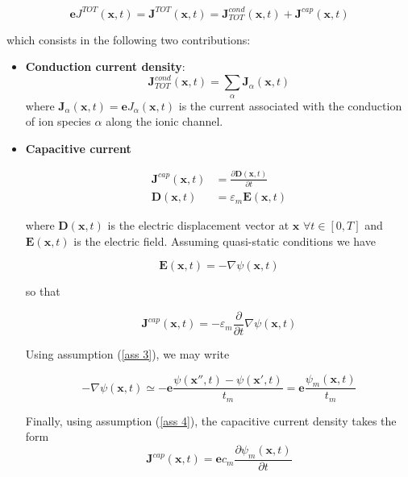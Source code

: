\documentclass[12pt, a4paper]{report}
\begin{document}
\begin{equation}
\textbf{e} J^{TOT}(\textbf{x},t) =	\textbf{J}^{TOT}(\textbf{x},t) = \textbf{J}^{cond}_{TOT}(\textbf{x},t) +\textbf{J}^{cap}(\textbf{x},t) 
\end{equation}	

which consists in the following two contributions:

\begin{itemize}
	
	\item \textbf{Conduction current density}: 
	\begin{equation}
	\textbf{J}^{cond}_{TOT}(\textbf{x},t) = \sum_{\alpha} \textbf{J}_{\alpha}(\textbf{x},t)
	\end{equation}
	where $\textbf{J}_{\alpha}(\textbf{x},t) = \textbf{e} J_{\alpha}(\textbf{x},t)$ is the current associated with the conduction of ion species $\alpha$ along the ionic channel.
	
	\item \textbf{Capacitive current} 
	
	\begin{align}
	\textbf{J}^{cap}(\textbf{x},t) &= \frac{\partial \textbf{D}(\textbf{x},t)}{\partial t}\\	
	\textbf{D}(\textbf{x},t) &= \varepsilon_m \textbf{E}(\textbf{x},t)
	\end{align}
	
	
	
	
	where $\textbf{D}(\textbf{x},t)$ is the electric displacement vector at $\textbf{x}$ $\forall t \in [0,T]$ and $\textbf{E}(\textbf{x},t)$ is the electric field. Assuming quasi-static conditions we have
	
	\begin{equation}
	\textbf{E}(\textbf{x},t) = - \nabla \psi(\textbf{x},t)
	\end{equation}
	
	so that
	
	\begin{equation}
	\textbf{J}^{cap}(\textbf{x},t) = -\varepsilon_m \frac{\partial}{\partial t}\nabla \psi(\textbf{x},t)
	\end{equation}
	
	
	
	Using assumption (\ref{ass 3}), we may write 
	
	$$ - \nabla \psi(\textbf{x},t) \simeq - \textbf{e} \frac{\psi(\textbf{x}'',t) - \psi(\textbf{x}',t)}{t_m} = \textbf{e} \frac{\psi_m(\textbf{x},t) }{t_m} $$
	
	Finally, using assumption (\ref{ass 4}), the capacitive current density takes the form
	\begin{equation}
	\textbf{J}^{cap}(\textbf{x},t) = \textbf{e} c_m \frac{\partial \psi_m (\textbf{x},t)}{\partial t}
	\end{equation}
\end{itemize}	
\end{document}
